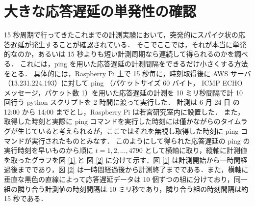 \documentclass[a4j]{jarticle}
\begin{document}
\section{大きな応答遅延の単発性の確認}
15 秒周期で行ってきたこれまでの計測実験において，突発的にスパイク状の応答遅延が発生することが確認されている．
そこでここでは，それが本当に単発的なのか，あるいは 15 秒よりも短い計測周期なら連続して得られるのかを調べる．
これには，ping を用いた応答遅延の計測間隔をできるだけ小さくする方法をとる．
具体的には，Raspberry Pi 上で 15 秒毎に，時刻取得後に AWS サーバ（13.231.224.193）に対して ping （パケットサイズ 60 バイト， ICMP ECHO メッセージ，パケット数 1）を用いた応答遅延の計測を 10 ミリ秒間隔で計 10 回行う python スクリプトを 2 時間に渡って実行した．
計測は 6 月 24 日 の 12:00 から 14:00 までとし，Raspberry Pi は若宮研究室内に設置した．
また，取得した時刻と実際に ping コマンドを実行した時刻には僅かながらのタイムラグが生じていると考えられるが，ここではそれを無視し取得した時刻に ping コマンドが実行されたものとみなす．
このようにして得られた応答遅延の ping の実行時刻を早いものから順に $t = 1,2,\ldots,4790$ として横軸に取り，縦軸に計測値を取ったグラフを図 \ref{1} と 図 \ref{2} に分けて示す．図 \ref{1} は計測開始から一時間経過後までであり，図 \ref{2} は一時間経過後から計測終了までである．また，横軸に垂直な黒色の直線によって応答遅延データは 10 個ずつの組に分けており，同一組の隣り合う計測値の時刻間隔は 10 ミリ秒であり，隣り合う組の時刻間隔は約 15 秒である．
\end{document}
